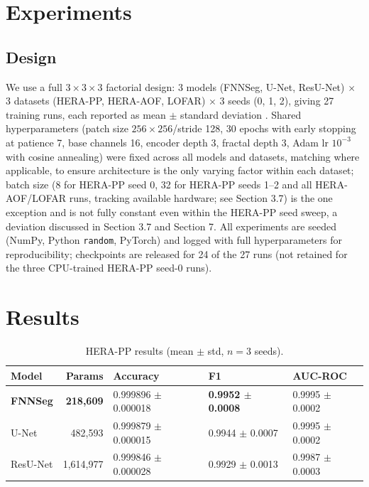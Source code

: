 \documentclass[11pt]{article}
\begin{document}
\section{Experiments}

\subsection{Design}

We use a full $3\times3\times3$ factorial design: 3 models (FNNSeg, U-Net, ResU-Net) $\times$ 3 datasets (HERA-PP, HERA-AOF, LOFAR) $\times$ 3 seeds (0, 1, 2), giving 27 training runs, each reported as mean $\pm$ standard deviation \citep{bouthillier2021}. Shared hyperparameters (patch size $256\times256$/stride 128, 30 epochs with early stopping at patience 7, base channels 16, encoder depth 3, fractal depth 3, Adam lr $10^{-3}$ with cosine annealing) were fixed across all models and datasets, matching \citet{dutoit2023} where applicable, to ensure architecture is the only varying factor within each dataset; batch size (8 for HERA-PP seed 0, 32 for HERA-PP seeds 1--2 and all HERA-AOF/LOFAR runs, tracking available hardware; see Section 3.7) is the one exception and is not fully constant even within the HERA-PP seed sweep, a deviation discussed in Section 3.7 and Section 7. All experiments are seeded (NumPy, Python \texttt{random}, PyTorch) and logged with full hyperparameters for reproducibility; checkpoints are released for 24 of the 27 runs (not retained for the three CPU-trained HERA-PP seed-0 runs).

\section{Results}

\begin{table}[h]
\centering
\caption{HERA-PP results (mean $\pm$ std, $n=3$ seeds).}
\begin{tabular}{lrlll}
\toprule
Model & Params & Accuracy & F1 & AUC-ROC \\
\midrule
\textbf{FNNSeg} & \textbf{218,609} & 0.999896 $\pm$ 0.000018 & \textbf{0.9952 $\pm$ 0.0008} & 0.9995 $\pm$ 0.0002 \\
U-Net & 482,593 & 0.999879 $\pm$ 0.000015 & 0.9944 $\pm$ 0.0007 & 0.9995 $\pm$ 0.0002 \\
ResU-Net & 1,614,977 & 0.999846 $\pm$ 0.000028 & 0.9929 $\pm$ 0.0013 & 0.9987 $\pm$ 0.0003 \\
\bottomrule
\end{tabular}
\end{table}
\end{document}
